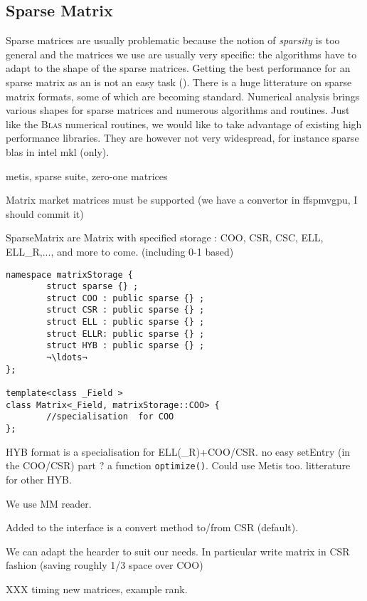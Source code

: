 \subsection{Sparse Matrix}
%
Sparse matrices are usually problematic because the notion of \emph{sparsity} is too general and the matrices
we use are usually very specific: the algorithms have to adapt to the shape of the sparse matrices.
Getting the best performance for an sparse matrix as an \applin is not an easy task
(\cf \cite{Boyer:2010:spmv}). There is a huge litterature
on sparse matrix formats, some of which are becoming standard. Numerical
analysis brings various shapes for sparse matrices and numerous algorithms and
routines.  Just like the \textsc{Blas} numerical routines, we would like to
take advantage of existing high performance libraries. They are however not very widespread, for instance
sparse blas in intel mkl (only).
%
\par
%
\danger  metis, sparse suite, zero-one matrices
%
\par
%
Matrix market matrices must be supported (we have a convertor in ffspmvgpu, I should commit it)
%
\par
%
SparseMatrix are Matrix with specified storage : COO, CSR, CSC, ELL,
ELL\_R,..., and more to come. (including 0-1 based)
%
\par
%
{
\def\indexTrait{other}
\begin{lstlisting}
namespace matrixStorage {
        struct sparse {} ;
        struct COO : public sparse {} ;
        struct CSR : public sparse {} ;
        struct ELL : public sparse {} ;
        struct ELLR: public sparse {} ;
        struct HYB : public sparse {} ;
        ¬\ldots¬
};

template<class _Field >
class Matrix<_Field, matrixStorage::COO> {
        //specialisation  for COO
};
\end{lstlisting}
}

%
\par
 HYB format is a specialisation for ELL(\_R)+COO/CSR. no easy setEntry (in the
COO/CSR) part ? a function \texttt{optimize()}. Could use \textsf{Metis} too.
litterature for other HYB.
\par
We use MM reader.
\par
Added to the interface is a convert method to/from CSR (default).
%
\par
%
We can adapt the hearder to suit our needs. In particular write matrix in CSR
fashion (saving roughly 1/3 space over COO)
%
\par
%
XXX timing new matrices, example rank.
%
